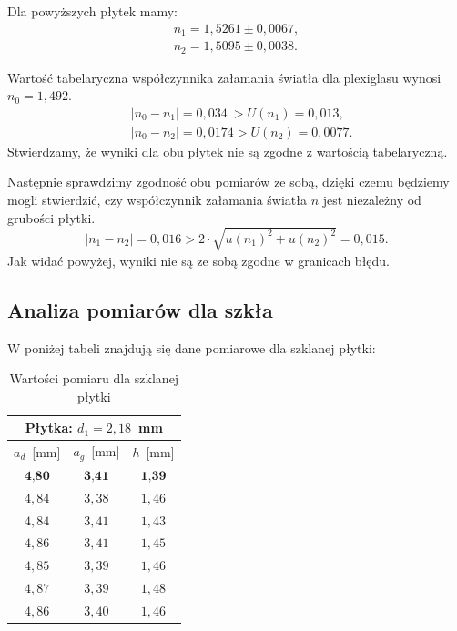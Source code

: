 \documentclass[12pt,a4paper]{article}
\numberwithin{equation}{section}
\begin{document}
Dla powyższych płytek mamy:
\begin{equation}
	\begin{split}
		n_1 = 1,5261 \pm 0,0067, \\
		n_2 = 1,5095 \pm 0,0038.
	\end{split}
\end{equation}

Wartość tabelaryczna współczynnika załamania światła dla plexiglasu wynosi $n_0 = 1,492$.
\begin{equation}
	\begin{split}
		&|n_0 - n_1| = 0,034 ~> U(n_1) = 0,013, \\
		&|n_0 - n_2| = 0,0174 > U(n_2) = 0,0077.
	\end{split}
\end{equation}
Stwierdzamy, że wyniki dla obu płytek nie są zgodne z wartością tabelaryczną.

Następnie sprawdzimy zgodność obu pomiarów ze sobą, dzięki czemu będziemy mogli stwierdzić, czy współczynnik załamania światła $n$ jest niezależny od grubości płytki.
\begin{equation}
	|n_1 - n_2| = 0,016 > 2 \cdot \sqrt{u(n_1)^2 + u(n_2)^2} = 0,015.
\end{equation}
Jak widać powyżej, wyniki nie są ze sobą zgodne w granicach błędu.

\subsection{Analiza pomiarów dla szkła}

W poniżej tabeli znajdują się dane pomiarowe dla szklanej płytki:

\begin{table}[!ht]
	\caption{Wartości pomiaru dla szklanej płytki}
	\centering
	\begin{tabular}{c|c|c}
		\hline \multicolumn{3}{c}{Płytka: $d_1 = 2,18$~mm} \\ \hline 
		$a_d$~[mm] & $a_g$~[mm] & $h$~[mm] \\ \hline \hline
		$\textbf{4,80}$ & $\textbf{3,41}$ & $\textbf{1,39}$ \\
		$4,84$ & $3,38$ & $1,46$ \\
		$4,84$ & $3,41$ & $1,43$ \\
		$4,86$ & $3,41$ & $1,45$ \\
		$4,85$ & $3,39$ & $1,46$ \\
		$4,87$ & $3,39$ & $1,48$ \\
		$4,86$ & $3,40$ & $1,46$ \\ \hline
	\end{tabular}
	\label{tab:tab2}
\end{table}
\end{document}
